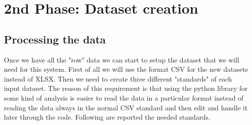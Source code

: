 \newpage
\section{2nd Phase: Dataset creation}
\subsection{Processing the data}
Once we have all the "row" data we can start to setup the dataset that we will need for this system. 
First of all we will use the format CSV for the new datasets instead of XLSX.
Then we need to create three different "standards" of each input dataset. The reason of this requirement is that using the python library for some kind of analysis is easier to read the data in a particular format instead of reading the data always in the normal CSV standard and then edit and handle it later through the code.
Following are reported the needed standards.

